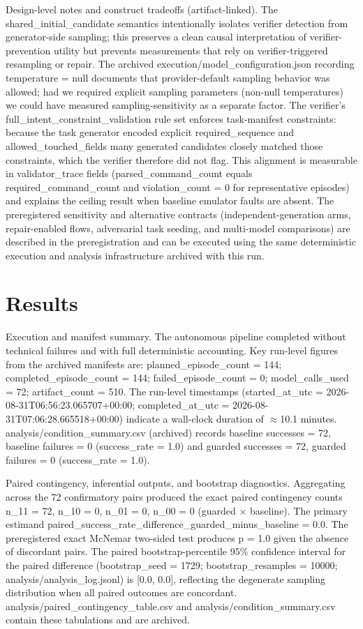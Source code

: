 \documentclass[conference]{IEEEtran}
\begin{document}
Design-level notes and construct tradeoffs (artifact-linked). The shared\_initial\_candidate semantics intentionally isolates verifier detection from generator-side sampling; this preserves a clean causal interpretation of verifier-prevention utility but prevents measurements that rely on verifier-triggered resampling or repair. The archived execution/model\_configuration.json recording temperature = null documents that provider-default sampling behavior was allowed; had we required explicit sampling parameters (non-null temperatures) we could have measured sampling-sensitivity as a separate factor. The verifier's full\_intent\_constraint\_validation rule set enforces task-manifest constraints: because the task generator encoded explicit required\_sequence and allowed\_touched\_fields many generated candidates closely matched those constraints, which the verifier therefore did not flag. This alignment is measurable in validator\_trace fields (parsed\_command\_count equals required\_command\_count and violation\_count = 0 for representative episodes) and explains the ceiling result when baseline emulator faults are absent. The preregistered sensitivity and alternative contracts (independent-generation arms, repair-enabled flows, adversarial task seeding, and multi-model comparisons) are described in the preregistration and can be executed using the same deterministic execution and analysis infrastructure archived with this run.

\section{Results}
Execution and manifest summary. The autonomous pipeline completed without technical failures and with full deterministic accounting. Key run-level figures from the archived manifests are: planned\_episode\_count = 144; completed\_episode\_count = 144; failed\_episode\_count = 0; model\_calls\_used = 72; artifact\_count = 510. The run-level timestamps (started\_at\_utc = 2026-08-31T06:56:23.065707+00:00; completed\_at\_utc = 2026-08-31T07:06:28.665518+00:00) indicate a wall-clock duration of \ensuremath{\approx}10.1 minutes. analysis/condition\_summary.csv (archived) records baseline successes = 72, baseline failures = 0 (success\_rate = 1.0) and guarded successes = 72, guarded failures = 0 (success\_rate = 1.0).

Paired contingency, inferential outputs, and bootstrap diagnostics. Aggregating across the 72 confirmatory pairs produced the exact paired contingency counts n\_11 = 72, n\_10 = 0, n\_01 = 0, n\_00 = 0 (guarded \ensuremath{\times} baseline). The primary estimand paired\_success\_rate\_difference\_guarded\_minus\_baseline = 0.0. The preregistered exact McNemar two-sided test produces p = 1.0 given the absence of discordant pairs. The paired bootstrap-percentile 95\% confidence interval for the paired difference (bootstrap\_seed = 1729; bootstrap\_resamples = 10000; analysis/analysis\_log.jsonl) is [0.0, 0.0], reflecting the degenerate sampling distribution when all paired outcomes are concordant. analysis/paired\_contingency\_table.csv and analysis/condition\_summary.csv contain these tabulations and are archived.
\end{document}
